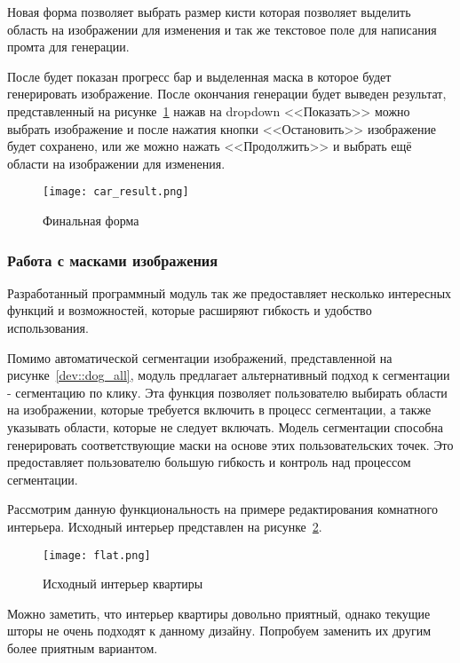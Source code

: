 Новая форма позволяет выбрать размер кисти которая позволяет выделить область на изображении для изменения и так же текстовое поле для написания промта для генерации. 

После будет показан прогресс бар и выделенная маска в которое будет генерировать изображение. После окончания генерации будет выведен результат, представленный на рисунке~\ref{man::car_end} нажав на dropdown <<Показать>> можно выбрать изображение и после нажатия кнопки <<Остановить>> изображение будет сохранено, или же можно нажать <<Продолжить>> и выбрать ещё области на изображении для изменения. 

\begin{figure}[ht]
    \centering
    \texttt{[image: car\_result.png]}
    \caption{Финальная форма}
    \label{man::car_end}
\end{figure}

\subsubsection{Работа с масками изображения}

Разработанный программный модуль так же предоставляет несколько интересных функций и возможностей, которые расширяют гибкость и удобство использования. 

Помимо автоматической сегментации изображений, представленной на рисунке~\ref{dev::dog_all},  модуль предлагает альтернативный подход к сегментации - сегментацию по клику. Эта функция позволяет пользователю выбирать области на изображении, которые требуется включить в процесс сегментации, а также указывать области, которые не следует включать. Модель сегментации способна генерировать соответствующие маски на основе этих пользовательских точек. Это предоставляет пользователю большую гибкость и контроль над процессом сегментации.

Рассмотрим данную функциональность на примере редактирования комнатного интерьера. Исходный интерьер представлен на рисунке~\ref{man::flat}. 

\begin{figure}[ht]
    \centering
    \texttt{[image: flat.png]}
    \caption{Исходный интерьер квартиры}
    \label{man::flat}
\end{figure}

Можно заметить, что интерьер квартиры довольно приятный, однако текущие шторы не очень подходят к данному дизайну. Попробуем заменить их другим более приятным вариантом.

